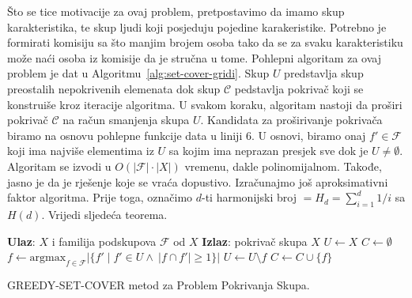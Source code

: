 \documentclass[a4paper, utf8, 11pt, colorlinks]{book}
\theoremstyle{definition}
\begin{document}
Što se tice motivacije za ovaj problem, pretpostavimo da imamo skup karakteristika, te skup ljudi koji posjeduju pojedine karakeristike. Potrebno je formirati komisiju sa što manjim brojem osoba tako da se za svaku karakteristiku može naći osoba iz komisije da je stručna u tome. Pohlepni algoritam za ovaj problem je dat u Algoritmu~\ref{alg:set-cover-gridi}.  %
Skup $U$ predstavlja skup preostalih nepokrivenih elemenata dok skup $\mathcal{C}$ pedstavlja pokrivač koji se konstruiše kroz iteracije algoritma. U svakom koraku, algoritam nastoji da proširi pokrivač $\mathcal{C}$ na račun smanjenja skupa $U$. Kandidata za proširivanje pokrivača biramo na osnovu pohlepne funkcije data u liniji 6. U osnovi, biramo onaj $f' \in \mathcal{F}$ koji ima najviše  elementima iz $U$ sa kojim ima neprazan presjek sve dok je $U \neq \emptyset$. Algoritam se izvodi u $O(|\mathcal{F}| \cdot |X|)$ vremenu, dakle  polinomijalnom. Takođe, jasno je da je rješenje koje se vraća dopustivo. Izračunajmo još aproksimativni faktor algoritma. Prije toga, označimo $d$-ti harmonijski broj $=H_d = \sum_{i=1}^d 1/i$ sa $H(d)$. 
Vrijedi sljedeća teorema.

\begin{algorithm}[!t] 
	\begin{algorithmic}[1]
		\STATE \textbf{Ulaz}: $X$ i familija podskupova $\mathcal{F}$ od $X$
		\STATE \textbf{Izlaz}: pokrivač skupa $X$
		\STATE $U \gets X$
		\STATE $C \gets \emptyset$
		\STATE $f \gets \mbox{argmax}_{f \in \mathcal{F}} |\{ f' \mid f' \in U  \wedge\ |f \cap f'| \geq 1\}| $
		\STATE $U \gets U \setminus f$
		\STATE $C \gets C \cup \{f\}$
		\ENDWHILE
	\end{algorithmic}
	\caption{GREEDY-SET-COVER metod za Problem Pokrivanja Skupa.}
    \label{alg:set-cover-gridi}
\end{algorithm}
\end{document}
